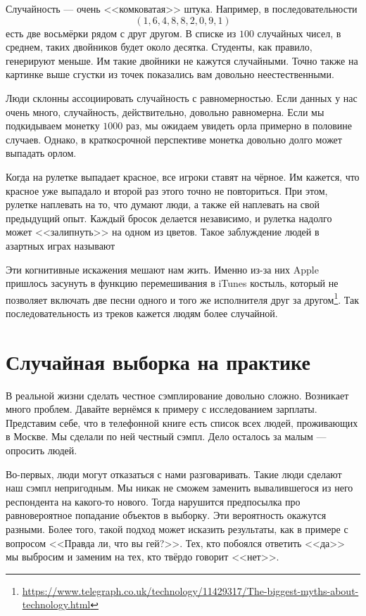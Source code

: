 \documentclass[12pt, a4paper, oneside]{article}
\begin{document}
Случайность --- очень <<комковатая>> штука. Например, в последовательности $$(1, 6, 4, 8, 8, 2, 0, 9, 1)$$ есть две восьмёрки рядом с друг другом. В списке из $100$ случайных чисел, в среднем, таких двойников будет около десятка. Студенты, как правило, генерируют меньше. Им такие двойники не кажутся случайными. Точно также на картинке выше сгустки из точек показались вам довольно неестественными. 

Люди склонны ассоциировать случайность с равномерностью. Если данных у нас очень много, случайность, действительно, довольно равномерна. Если мы подкидываем монетку $1000$ раз, мы ожидаем увидеть орла примерно в половине случаев.  Однако, в краткосрочной перспективе монетка довольно долго может выпадать орлом. 

Когда на рулетке выпадает красное, все игроки ставят на чёрное. Им кажется, что красное уже выпадало и второй раз этого точно не повториться. При этом, рулетке наплевать на то, что думают люди, а также ей наплевать на свой предыдущий опыт. Каждый бросок делается независимо, и рулетка надолго может <<залипнуть>> на одном из цветов. Такое заблуждение людей в азартных играх называют 

Эти когнитивные искажения мешают нам жить. Именно из-за них Apple пришлось засунуть в функцию перемешивания в iTunes костыль, который не позволяет включать две песни одного и того же исполнителя друг за другом\footnote{\url{https://www.telegraph.co.uk/technology/11429317/The-biggest-myths-about-technology.html}}. Так последовательность из треков кажется людям более случайной.  


\section{Случайная выборка на практике} 

В реальной жизни сделать честное сэмплирование довольно сложно. Возникает много проблем. Давайте вернёмся к примеру с исследованием зарплаты. Представим себе, что в телефонной книге есть список всех людей, проживающих в Москве. Мы сделали по ней честный сэмпл. Дело осталось за малым --- опросить людей. 

Во-первых, люди могут отказаться с нами разговаривать. Такие люди сделают наш сэмпл непригодным. Мы никак не сможем заменить вывалившегося из него респондента на какого-то нового. Тогда нарушится предпосылка про равновероятное попадание объектов в выборку. Эти вероятность окажутся разными. Более того, такой подход может исказить результаты, как в примере с вопросом <<Правда ли, что вы гей?>>. Тех, кто побоялся ответить <<да>> мы выбросим и заменим на тех, кто твёрдо говорит <<нет>>. 
\end{document}
